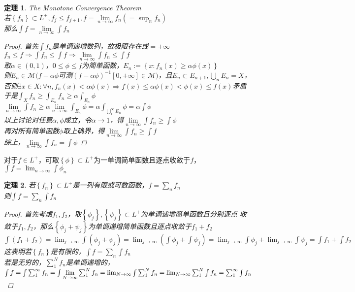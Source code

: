 \documentclass[12pt, a4paper, oneside]{ctexbook}
\newtheorem{theorem}{定理}[section]
\begin{document}
\begin{theorem}{The Monotone Convergence Theorem}
    \\若$\left\{f_n\right\}\subset L^+,f_j\leq f_{j+1},f=\underset{n\to\infty}{\lim}f_n(=\sup_n f_n)$\\
    那么$\int f=\underset{n\to\infty}{\lim}\int f_n$
    \begin{proof}
        首先$\int f_n$是单调递增数列，故极限存在或$=+\infty$\\
        $f_n\leq f\Rightarrow \int f_n\leq\int f\Rightarrow \underset{n\to\infty}{\lim}\int f_n\leq \int f$\\
        取$\alpha\in(0,1)$，$0\leq \phi\leq f$为简单函数，$E_n:=\left\{x:f_n(x)\geq\alpha\phi(x)\right\}$\\
        则$E_n\in\mathcal{M}(f-\alpha\phi$可测$(f-\alpha\phi)^{-1}[0,+\infty]\in\mathcal{M})$，且$E_n\subset E_{n+1},\bigcup_nE_n=X$，
        否则$\exists x\in X:\forall n,f_n(x)<\alpha\phi(x)\Rightarrow f(x)\leq\alpha\phi(x)<\phi(x)\leq f(x)$矛盾
        于是$\int_X f_n\geq\int_{E_n}f_n\geq\alpha\int_{E_n}\phi$\\
        $\underset{n\to\infty}{\lim}\int f_n\geq\alpha\underset{n\to\infty}{\lim}\int_{E_n}\phi=\alpha\int_{\bigcup_1^{\infty}E_n}\phi=\alpha\int\phi$\\
        以上讨论对任意$\alpha,\phi$成立，令$\alpha\to 1$，得$\underset{n\to\infty}{\lim}\int f_n\geq\int\phi$\\
        再对所有简单函数$\phi$取上确界，得$\underset{n\to\infty}{\lim}\int f_n\geq\int f$\\
        综上，$\underset{n\to\infty}{\lim}\int f_n=\int\phi$
    \end{proof}
\end{theorem}
对于$f\in L^+$，可取$\left\{\phi\right\}\subset L^+$为一单调简单函数且逐点收敛于$f$，$\int f=\lim_{n\to\infty}\int \phi_n$
\begin{theorem}
    若$\left\{f_n\right\}\subset L^+$是一列有限或可数函数，$f=\sum_nf_n$\\
    则$\int f=\sum_n\int f_n$
    \begin{proof}
        首先考虑$f_1,f_2$，取$\left\{\phi_j\right\},\left\{\psi_j\right\}\subset L^+$为单调递增简单函数且分别逐点
        收敛于$f_1,f_2$，那么$\left\{\phi_j+\psi_j\right\}$为单调递增简单函数且逐点收敛于$f_1+f_2$\\
        $\int(f_1+f_2)=\lim_{j\to\infty}\int(\phi_j+\psi_j)=\lim_{j\to\infty}(\int\phi_j+\int\psi_j)=\lim_{j\to\infty}\int\phi_j+
        \lim_{j\to\infty}\int\psi_j=\int f_1+\int f_2$\\
        这表明若$\left\{f_n\right\}$是有限的，$\int f=\sum_n \int f_n$\\
        若是无穷的，$\sum_1^Nf_n$是单调递增的，$\int f=\int\sum_1^{\infty}f_n=\int\underset{N\to\infty}{\lim}\sum_1^Nf_n\\
        =\lim_{N\to\infty}\int\sum_1^Nf_n=\lim_{N\to\infty}\sum_1^N\int f_n=\sum_1^{\infty}\int f_n$
    \end{proof}
\end{theorem}
\end{document}
